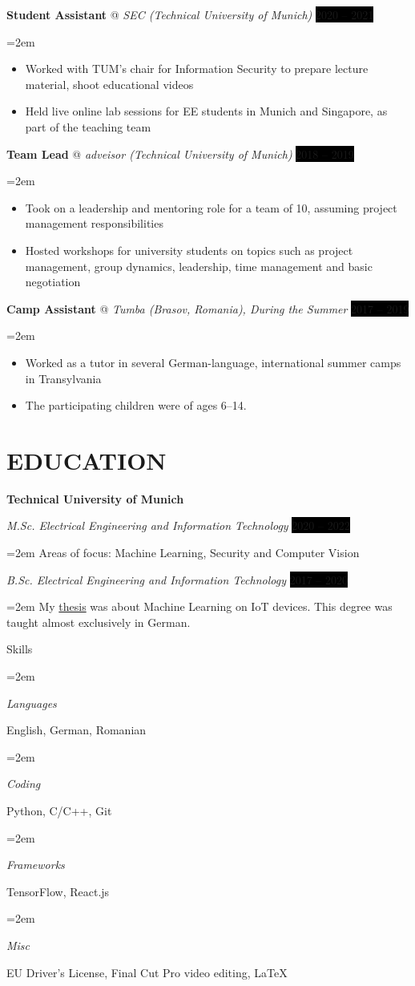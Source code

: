 \documentclass[paper=a4,fontsize=11pt]{scrartcl}
\makeatletter
\newlength{\spacebox}
\newcommand{\sepspace}{\vspace*{0.45em}}		%
\newcommand{\NewPart}[1]{\section*{\uppercase{#1}}}
\newcommand{\PersonalEntry}[2]{
		\noindent\hangindent=2em\hangafter=0 %
		\parbox{\spacebox}{        %
		\textit{#1}}		       %
		\hspace{1.5em} #2 \par}    %
\newcommand{\SkillsEntry}[2]{      %
		\noindent\hangindent=2em\hangafter=0 %
		\parbox{\spacebox}{        %
		\textit{#1}}			   %
		\hspace{2.5em} #2 \par}    %
\newcommand{\EducationEntry}[4]{
		\noindent \textit{#1} \hfill      %
		\colorbox{black}{\color{white}#2} \par  %
		\noindent\hangindent=2em\hangafter=0 \small #3 %
		\normalsize \par}
\newcommand{\WorkEntry}[4]{				  %
		\noindent \textbf{#1} @ \textit{#3} \hfill      %
		\colorbox{black}{\color{white}#2} \par  %
		\noindent\hangindent=2em\hangafter=0 \small #4 %
		\normalsize \par}
\makeatother
\begin{document}
\WorkEntry{Student Assistant}{2020 – 2021}{SEC (Technical University of Munich)}
{
\begin{itemize}
  \item Worked with TUM's chair for Information Security to prepare lecture material, shoot educational videos
  \item Held live online lab sessions for EE students in Munich and Singapore, as part of the teaching team
\end{itemize}
}
\sepspace

\WorkEntry{Team Lead}{2018 – 2019}{adveisor (Technical University of Munich)}
{
\begin{itemize}
  \item Took on a leadership and mentoring role for a team of 10, assuming project management responsibilities
  \item Hosted workshops for university students on topics such as project management, group dynamics, leadership, time management and basic negotiation
\end{itemize}
}
\sepspace

\WorkEntry{Camp Assistant}{2017 – 2019}{Tumba (Brasov, Romania), During the Summer}
{
\begin{itemize}
  \item Worked as a tutor in several German-language, international summer camps in Transylvania
  \item The participating children were of ages 6–14.
\end{itemize}
}

\NewPart{Education}{}
\textbf{Technical University of Munich}

\EducationEntry{M.Sc. Electrical Engineering and Information Technology}{2020 – 2022}{Areas of focus: Machine Learning, Security and Computer Vision}
\sepspace

\EducationEntry{B.Sc. Electrical Engineering and Information Technology}{2017 – 2020}{My \href{https://github.com/munober/thesis/blob/master/digital_edition.pdf}{thesis} was about Machine Learning on IoT devices. This degree was taught almost exclusively in German.}


\NewPart{Skills}{}

\SkillsEntry{Languages}{English, German, Romanian}
\SkillsEntry{Coding}{Python, \textsc{C/C++}, Git}
\SkillsEntry{Frameworks}{TensorFlow, React.js}
\SkillsEntry{Misc}{EU Driver's License, Final Cut Pro video editing, \LaTeX}


\end{document}
